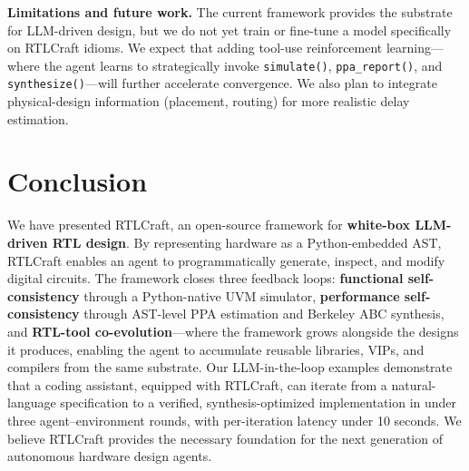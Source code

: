 \documentclass[11pt]{article}
\begin{document}
\textbf{Limitations and future work.} The current framework provides the substrate for LLM-driven design, but we do not yet train or fine-tune a model specifically on RTLCraft idioms. We expect that adding tool-use reinforcement learning---where the agent learns to strategically invoke \texttt{simulate()}, \texttt{ppa\_report()}, and \texttt{synthesize()}---will further accelerate convergence. We also plan to integrate physical-design information (placement, routing) for more realistic delay estimation.

\section{Conclusion}
\label{sec:conclusion}

We have presented RTLCraft, an open-source framework for \textbf{white-box LLM-driven RTL design}. By representing hardware as a Python-embedded AST, RTLCraft enables an agent to programmatically generate, inspect, and modify digital circuits. The framework closes three feedback loops: \textbf{functional self-consistency} through a Python-native UVM simulator, \textbf{performance self-consistency} through AST-level PPA estimation and Berkeley ABC synthesis, and \textbf{RTL-tool co-evolution}---where the framework grows alongside the designs it produces, enabling the agent to accumulate reusable libraries, VIPs, and compilers from the same substrate. Our LLM-in-the-loop examples demonstrate that a coding assistant, equipped with RTLCraft, can iterate from a natural-language specification to a verified, synthesis-optimized implementation in under three agent--environment rounds, with per-iteration latency under 10 seconds. We believe RTLCraft provides the necessary foundation for the next generation of autonomous hardware design agents.



\end{document}
